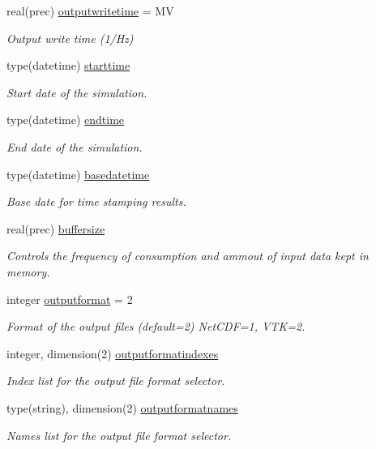 \begin{DoxyCompactItemize}
real(prec) \mbox{\hyperlink{structsimulationglobals__mod_1_1parameters__t_a283fe10ad9daf8ffe2ca526ee990daa9}{outputwritetime}} = MV
\begin{DoxyCompactList}\small\item\em Output write time (1/\+Hz) \end{DoxyCompactList}\item 
type(datetime) \mbox{\hyperlink{structsimulationglobals__mod_1_1parameters__t_a204cdccb6f9cd2fa137210a7f28f676d}{starttime}}
\begin{DoxyCompactList}\small\item\em Start date of the simulation. \end{DoxyCompactList}\item 
type(datetime) \mbox{\hyperlink{structsimulationglobals__mod_1_1parameters__t_a2fcf43eac4c8f57debf9f35d90a121f6}{endtime}}
\begin{DoxyCompactList}\small\item\em End date of the simulation. \end{DoxyCompactList}\item 
type(datetime) \mbox{\hyperlink{structsimulationglobals__mod_1_1parameters__t_a1bededd2546224cb5b4ebb290105a078}{basedatetime}}
\begin{DoxyCompactList}\small\item\em Base date for time stamping results. \end{DoxyCompactList}\item 
real(prec) \mbox{\hyperlink{structsimulationglobals__mod_1_1parameters__t_a897b2f6d34ecad28a7ceb45c1dcb8dfd}{buffersize}}
\begin{DoxyCompactList}\small\item\em Controls the frequency of consumption and ammout of input data kept in memory. \end{DoxyCompactList}\item 
integer \mbox{\hyperlink{structsimulationglobals__mod_1_1parameters__t_a455601cb209772820789bdfd696628d2}{outputformat}} = 2
\begin{DoxyCompactList}\small\item\em Format of the output files (default=2) Net\+C\+DF=1, V\+TK=2. \end{DoxyCompactList}\item 
integer, dimension(2) \mbox{\hyperlink{structsimulationglobals__mod_1_1parameters__t_ac4e90208e4fb5c5fc0a673b03fc908d7}{outputformatindexes}}
\begin{DoxyCompactList}\small\item\em Index list for the output file format selector. \end{DoxyCompactList}\item 
type(string), dimension(2) \mbox{\hyperlink{structsimulationglobals__mod_1_1parameters__t_a75f99aae482ed1092b84b5bbff494d99}{outputformatnames}}
\begin{DoxyCompactList}\small\item\em Names list for the output file format selector. \end{DoxyCompactList}\end{DoxyCompactItemize}


